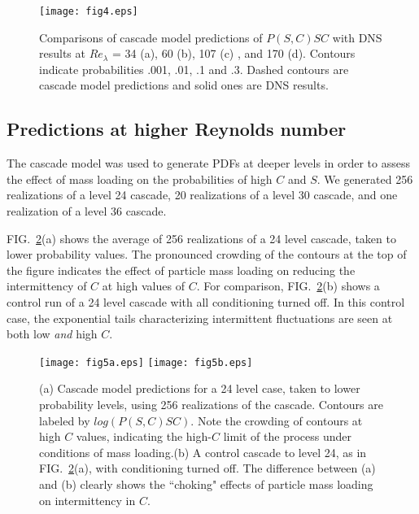 \documentclass[aps,pra,twocolumn,groupedaddress,showkeys,showpacs,floatfix]{revtex4}
\begin{document}
\begin{figure}[h]
\begin{center}
\texttt{[image: fig4.eps]}
\caption{\label{fig4}Comparisons of cascade model predictions of $P(S,C)SC$ with DNS     
results at $Re_\lambda$ = 34 (a), 60 (b), 107 (c) , and 170 (d).     
Contours indicate probabilities  .001, .01, .1 and .3. Dashed contours are
cascade model predictions and solid ones are DNS results.}
\end{center}
\end{figure}


\subsection { Predictions at higher Reynolds number }

The cascade model was used to generate PDFs at deeper levels in order to
assess the effect of mass loading on the probabilities of high $C$ and $S$. We
generated 256 realizations of a level 24 cascade, 20 realizations of a level 30
cascade, and one realization of a level 36 cascade.


FIG.~\ref{fig5}(a) shows the average of 256 realizations of a 24 level cascade, taken to
lower probability values. 
The pronounced crowding of the contours at the top of
the figure indicates the effect of particle mass loading on reducing the
intermittency of $C$ at high values of $C$. For comparison, FIG.~\ref{fig5}(b) shows a
control run of a 24 level cascade with all conditioning turned off. In this
control case, the exponential tails characterizing intermittent fluctuations
are seen at both low {\it and} high $C$.




\begin{figure}[h]
\begin{center}
\texttt{[image: fig5a.eps]}
\texttt{[image: fig5b.eps]}
\caption{\label{fig5}(a) Cascade model predictions for a 24 level case, taken to lower
probability levels, using 256 realizations of the cascade. Contours are labeled
by $log(P(S,C)SC)$. Note the crowding of contours at high $C$
values, indicating the high-$C$ limit of the process under conditions of
mass loading.(b) A control cascade to level 24, as in FIG.~\ref{fig5}(a), with
conditioning turned off. The difference between (a) and (b) clearly shows the
``choking" effects of particle mass loading on intermittency in $C$. }
\end{center}
\end{figure}
\end{document}
